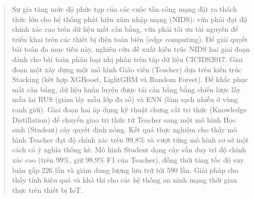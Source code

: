 \begin{abstract}
Sự gia tăng mức độ phức tạp của các cuộc tấn công mạng đặt ra thách thức lớn cho hệ thống phát hiện xâm nhập mạng (NIDS): vừa phải đạt độ chính xác cao trên dữ liệu mất cân bằng, vừa phải tối ưu tài nguyên để triển khai trên các thiết bị điện toán biên (edge computing). Để giải quyết bài toán đa mục tiêu này, nghiên cứu đề xuất kiến trúc NIDS hai giai đoạn dành cho bài toán phân loại nhị phân trên tập dữ liệu CICIDS2017. Giai đoạn một xây dựng một mô hình Giáo viên (Teacher) dựa trên kiến trúc Stacking (kết hợp XGBoost, LightGBM và Random Forest). Để khắc phục mất cân bằng, dữ liệu huấn luyện được tái cân bằng bằng chiến lược lấy mẫu lai RUS (giảm lấy mẫu lớp đa số) và ENN (làm sạch nhiễu ở vùng ranh giới). Giai đoạn hai áp dụng kỹ thuật chưng cất tri thức (Knowledge Distillation) để chuyển giao tri thức từ Teacher sang một mô hình Học sinh (Student) cây quyết định nông. Kết quả thực nghiệm cho thấy mô hình Teacher đạt độ chính xác trên 99,8\% và vượt từng mô hình cơ sở một cách có ý nghĩa thống kê. Mô hình Student dạng cây vẫn duy trì độ chính xác cao (trên 99\%, giữ 98,9\% F1 của Teacher), đồng thời tăng tốc độ suy luận gấp 226 lần và giảm dung lượng lưu trữ tới 590 lần. Giải pháp cho thấy tính hiệu quả và khả thi cho các hệ thống an ninh mạng thời gian thực trên thiết bị IoT.
\end{abstract}
